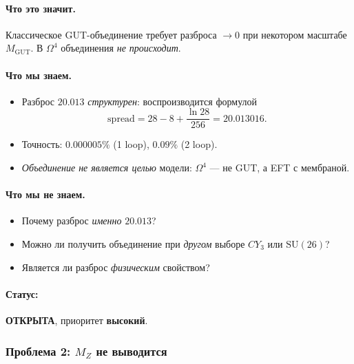 \documentclass[11pt,a4paper]{article}
\newcommand{\SU}{\mathrm{SU}}
\newcommand{\CY}{CY_3}
\newcommand{\Om}{\Omega^4}
\theoremstyle{definition}
\begin{document}
\paragraph{Что это значит.}
Классическое GUT-объединение требует разброса $\to 0$ при 
некотором масштабе $M_{\text{GUT}}$. В $\Om$ объединения 
\emph{не происходит}.

\paragraph{Что мы знаем.}
\begin{itemize}
    \item Разброс $20.013$ \emph{структурен}: воспроизводится 
          формулой
          \begin{equation}
              \text{spread} = 28 - 8 + \frac{\ln 28}{256} 
              = 20.013016.
          \end{equation}
    \item Точность: $0.000005\%$ (1 loop), $0.09\%$ (2 loop).
    \item \emph{Объединение не является целью} модели: 
          $\Om$ — не GUT, а EFT с мембраной.
\end{itemize}

\paragraph{Что мы не знаем.}
\begin{itemize}
    \item Почему разброс \emph{именно} $20.013$?
    \item Можно ли получить объединение при \emph{другом} 
          выборе $\CY$ или $\SU(26)$?
    \item Является ли разброс \emph{физическим} свойством?
\end{itemize}

\paragraph{Статус:} \textbf{ОТКРЫТА}, приоритет \textbf{высокий}.

\subsubsection{Проблема 2: $M_Z$ не выводится}
\end{document}
